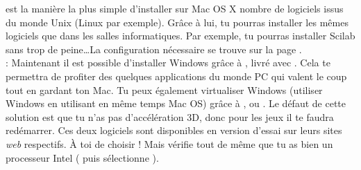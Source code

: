 
 est la manière la plus simple d'installer sur Mac OS X nombre de logiciels issus du monde Unix (Linux par exemple). Grâce à lui, tu pourras installer les mêmes logiciels que dans les salles informatiques. Par exemple, tu pourras installer Scilab sans trop de peine\dots La configuration nécessaire se trouve sur la page  . \\ 

  : Maintenant il est possible d'installer Windows grâce à , livré avec . Cela te permettra de profiter des quelques applications du monde PC qui valent le coup tout en gardant ton Mac. Tu peux également virtualiser Windows (utiliser Windows en utilisant en même temps Mac OS) grâce à ,  ou . Le  défaut de cette solution est que tu n'as pas d'accélération 3D, donc pour les jeux il te faudra redémarrer. Ces deux logiciels sont disponibles en version d'essai sur leurs sites \emph{web} respectifs. \`A toi de choisir !
Mais vérifie tout de même que tu as bien un processeur Intel ( puis sélectionne ).

\clearpage

